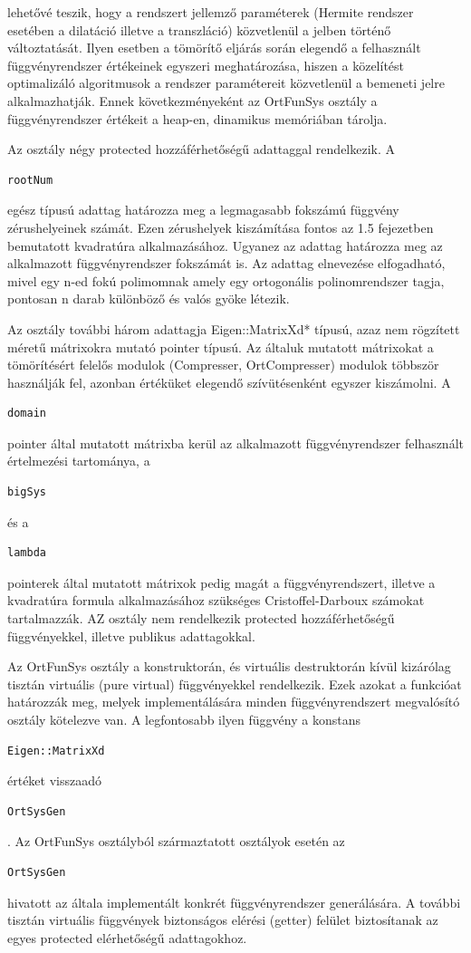 \documentclass[oneside,titlepage,12pt,a4paper]{report}
\begin{document}
lehetővé teszik, hogy a rendszert jellemző paraméterek (Hermite rendszer esetében a dilatáció illetve a transzláció) közvetlenül a jelben történő változtatását. 
Ilyen esetben a tömörítő eljárás során elegendő a felhasznált függvényrendszer értékeinek egyszeri meghatározása, hiszen a közelítést optimalizáló algoritmusok 
a rendszer paramétereit közvetlenül a bemeneti jelre alkalmazhatják. Ennek következményeként az OrtFunSys osztály a függvényrendszer értékeit a heap-en, dinamikus memóriában tárolja.
\par Az osztály négy protected hozzáférhetőségű adattaggal rendelkezik. A \begin{verbatim}rootNum\end{verbatim} egész típusú adattag határozza meg a legmagasabb fokszámú függvény zérushelyeinek számát. Ezen zérushelyek kiszámítása fontos az 1.5 fejezetben bemutatott kvadratúra alkalmazásához. Ugyanez az adattag határozza meg az alkalmazott függvényrendszer fokszámát is. Az adattag elnevezése elfogadható, mivel egy n-ed fokú polimomnak amely egy ortogonális polinomrendszer tagja, pontosan n darab különböző és valós gyöke létezik.
\par Az osztály további három adattagja Eigen::MatrixXd* típusú, azaz nem rögzített méretű mátrixokra mutató pointer típusú. Az általuk mutatott mátrixokat a tömörítésért felelős modulok (Compresser, OrtCompresser) modulok többször használják fel, azonban értéküket elegendő szívütésenként egyszer kiszámolni.  A \begin{verbatim}domain\end{verbatim} pointer által mutatott mátrixba kerül az alkalmazott függvényrendszer felhasznált értelmezési tartománya, a \begin{verbatim}bigSys\end{verbatim} és a \begin{verbatim}lambda\end{verbatim} pointerek által mutatott mátrixok pedig magát a függvényrendszert, illetve a kvadratúra formula alkalmazásához szükséges Cristoffel-Darboux számokat tartalmazzák. AZ osztály nem rendelkezik protected hozzáférhetőségű függvényekkel, illetve publikus adattagokkal.
\par Az OrtFunSys osztály a konstruktorán, és virtuális destruktorán kívül kizárólag tisztán virtuális (pure virtual) függvényekkel rendelkezik. Ezek azokat a funkcióat határozzák meg, melyek implementálására minden függvényrendszert megvalósító osztály kötelezve van. A legfontosabb ilyen függvény a konstans \begin{verbatim}Eigen::MatrixXd\end{verbatim} értéket visszaadó \begin{verbatim}OrtSysGen\end{verbatim}. Az OrtFunSys osztályból származtatott osztályok esetén az \begin{verbatim}OrtSysGen\end{verbatim} hivatott az általa implementált konkrét függvényrendszer generálására. A további tisztán virtuális függvények biztonságos elérési (getter) felület biztosítanak az egyes protected elérhetőségű adattagokhoz. 
\end{document}
